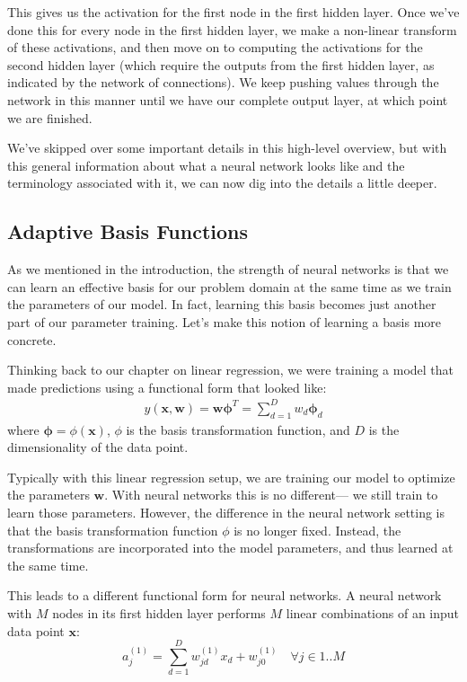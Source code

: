 This gives us the activation for the first node in the first hidden layer. Once we've done this for every node in the first hidden layer, we make a non-linear transform of these activations, and then move on to computing the activations for the second hidden layer (which require the outputs from the first hidden layer, as indicated by the network of connections). We keep pushing values through the network in this manner until we have our complete output layer, at which point we are finished.

We've skipped over some important details in this high-level overview, but with this general information about what a neural network looks like and the terminology associated with it, we can now dig into the details a little deeper.

\subsection{Adaptive Basis Functions}
As we mentioned in the introduction, the strength of neural networks is that we can learn an effective basis for our problem domain at the same time as we train the parameters of our model. In fact, learning this basis becomes just another part of our parameter training. Let's make this notion of learning a basis more concrete.

Thinking back to our chapter on linear regression, we were training a model that made predictions using a functional form that looked like:
\begin{align*}
	y(\textbf{x}, \textbf{w}) = \textbf{w} \boldsymbol{\phi}^{T} = \sum_{d=1}^{D} w_{d} \boldsymbol{\phi}_{d}
\end{align*}
where $\boldsymbol{\phi} = \phi(\textbf{x})$, $\phi$ is the basis transformation function, and $D$ is the dimensionality of the data point.

Typically with this linear regression setup, we are training our model to optimize the parameters $\textbf{w}$. With neural networks this is no different--- we still train to learn those parameters. However, the difference in the neural network setting is that the basis transformation function $\phi$ is no longer fixed. Instead, the transformations are incorporated into the model parameters, and thus learned at the same time.

This leads to a different functional form for neural networks. A neural network with $M$ nodes in its first hidden layer  performs $M$ linear combinations of an input data point $\textbf{x}$:
\begin{equation} \label{basic-nn-form}
	a^{(1)}_{j} = \sum_{d=1}^{D} w_{jd}^{(1)} x_{d} + w_{j0}^{(1)} \quad \forall j \in 1..M
      \end{equation}

